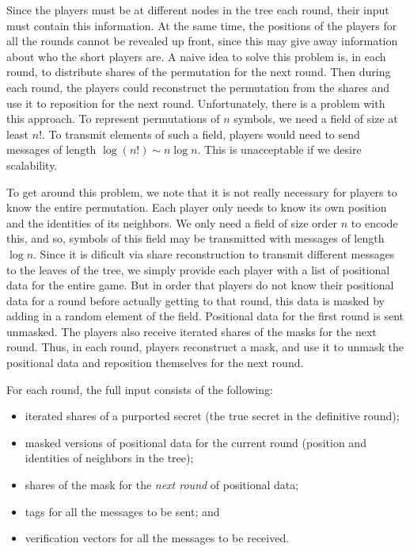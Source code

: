 \documentclass[12pt]{article}
\theoremstyle{definition}
\begin{document}
Since the players must be at different nodes in the tree each round, their 
input must contain this information. At the same time, the positions of the 
players for all the rounds cannot be revealed up front, since this may give 
away information about who the short players are. A naive idea to solve this 
problem is, in each round, to distribute shares of the permutation for the 
next round. Then 
during each round, the players could reconstruct the permutation from the 
shares and use it to reposition for the next round. Unfortunately, there 
is a problem with this approach. To represent permutations of $n$ symbols, 
we need a field of size at least $n!$. To transmit elements of such a field,
players would need to send messages of length $\log (n!) \sim n\log n$.
This is unacceptable if we desire scalability. 

To get around this problem, we note that it is not really necessary for 
players to know the entire permutation. Each player only needs to know 
its own position and the identities of its neighbors. We only need a field 
of size order $n$ to encode this, and so, symbols of this field may be 
transmitted with messages of length $\log n$. Since it is dificult 
via share reconstruction to transmit different messages to the leaves of 
the tree, we simply provide each player with a list of positional data for the 
entire game. But in order that players do not know their positional data 
for a round before actually getting to that round, this data is masked 
by adding in a random element of the field. Positional data for the first 
round is sent unmasked. The players also receive iterated shares of the masks
for the next round. Thus, in each round, players reconstruct a mask, and use it 
to unmask the positional data and reposition themselves for the next round.

For each round, the full input consists of the following:
\begin{itemize}
\item iterated shares of a purported secret (the true secret in the 
definitive round);
\item masked versions of positional data for the current round 
(position and identities of neighbors in the tree);
\item shares of the mask for the \emph{next round} of positional data;
\item tags for all the messages to be sent; and
\item verification vectors for all the messages to be received.
\end{itemize}
\end{document}
